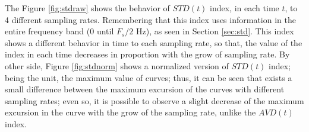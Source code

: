 \documentclass[review]{elsarticle}
\begin{document}
The Figure \ref{fig:stdraw} shows the  behavior of $STD(t)$ index, in each time $t$, 
to 4 different sampling rates. Remembering that this index uses information in the entire frequency
band ($0$ until $F_s/2$ Hz), as seen in Section \ref{sec:std}.
This index shows a different behavior in time to each sampling rate,
so that, the value of the index in each time  decreases in proportion with 
the grow of sampling rate. By other side,
Figure \ref{fig:stdnorm} shows a normalized version of $STD(t)$ index;
being the unit, the maximum value of curves; thus,
it can be seen that exists a small difference between the maximum excursion 
of the curves with different sampling rates; even so, it is possible to observe
a slight decrease of the maximum excursion in the curve with the grow of the sampling rate, 
unlike the $AVD(t)$ index.
\end{document}
